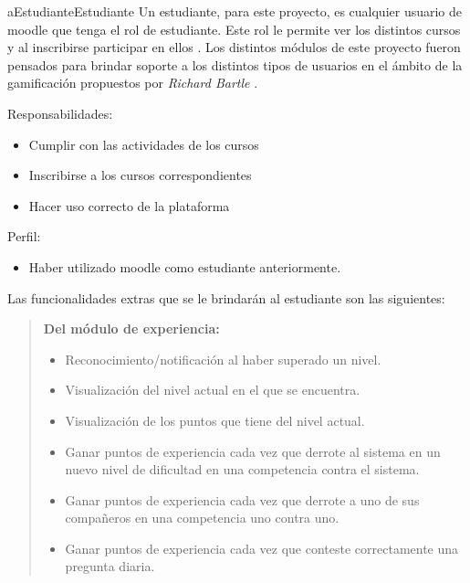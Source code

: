     \begin{actor}{aEstudiante}{Estudiante}{%
    Un estudiante, para este proyecto, es cualquier usuario de moodle que tenga el rol de
    estudiante. Este rol le permite ver los distintos cursos y al inscribirse participar
    en ellos \cite{MoodleRolEstudiante}. Los distintos módulos de este proyecto fueron pensados
    para brindar soporte a los distintos tipos de usuarios en el ámbito de la gamificación
    propuestos por {\it Richard Bartle} \cite{BartleUsuarios}.\\}

    \item[Responsabilidades:] \hfill
        \begin{itemize}
        \item Cumplir con las actividades de los cursos
        \item Inscribirse a los cursos correspondientes
        \item Hacer uso correcto de la plataforma
        \end{itemize}

    \item[Perfil:] \hfill
        \begin{itemize}
        \item Haber utilizado moodle como estudiante anteriormente.
        \end{itemize}
    \end{actor}

    \noindent
    Las funcionalidades extras que se le brindarán al estudiante son las siguientes:

    \begin{quote}
    {\bf Del módulo de experiencia:}
        \begin{itemize}
        \item Reconocimiento/notificación al haber superado un nivel.
        \item Visualización del nivel actual en el que se encuentra.
        \item Visualización de los puntos que tiene del nivel actual.
        \item Ganar puntos de experiencia cada vez que derrote al sistema en un nuevo nivel de dificultad en una competencia contra el sistema.
        \item Ganar puntos de experiencia cada vez que derrote a uno de sus compañeros en una competencia uno contra uno.
        \item Ganar puntos de experiencia cada vez que conteste correctamente una pregunta diaria.
        \end{itemize}
    \end{quote}

